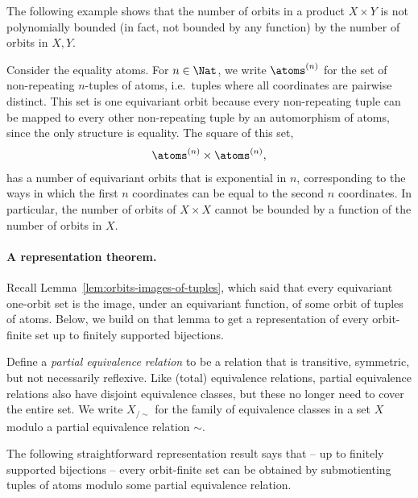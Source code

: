 The following example shows that the number of orbits in a product $X \times Y$ is not polynomially bounded (in fact, not bounded by any function) by the number of orbits in $X,Y$. 
\begin{myexample}
	Consider the equality atoms. For $n \in \Nat$, we write $\atoms^{(n)}$ for the set of non-repeating $n$-tuples of atoms, i.e.~tuples where all coordinates are pairwise distinct. This set is one equivariant orbit because every non-repeating tuple can be mapped to every other non-repeating tuple by an automorphism of atoms, since the only structure is equality. The square of this set, 
   \begin{align*}
	   \atoms^{(n)} \times \atoms^{(n)},
   \end{align*}
   has a number of equivariant orbits that is exponential in $n$, corresponding to the ways in which the first $n$ coordinates can be equal to the second $n$ coordinates.
   In particular, the number of orbits of $X \times X$ cannot be bounded by a function of the number of orbits in $X$.
\end{myexample}


\paragraph*{A representation theorem.} Recall Lemma~\ref{lem:orbits-images-of-tuples}, which said that every equivariant one-orbit set is the image, under an equivariant function, of some orbit of tuples of atoms. Below, we build on that lemma to get a representation of every orbit-finite set up to finitely supported bijections. 

Define a \emph{partial equivalence relation} to be a relation that is transitive, symmetric, but not necessarily reflexive. Like (total) equivalence relations, partial equivalence relations also have disjoint equivalence classes, but these no longer need to cover the entire set. We write $X_{/\sim}$ for the family of equivalence classes in a set $X$ modulo a partial equivalence relation $\sim$. 

The following straightforward representation result says that -- up to finitely supported bijections -- every orbit-finite set can be obtained by submotienting tuples of atoms modulo some partial equivalence relation.

